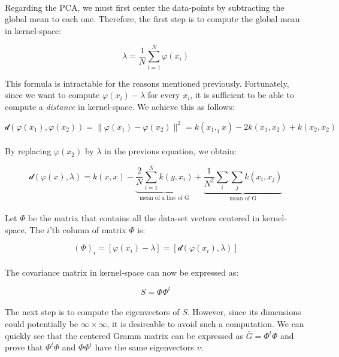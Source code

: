 \paragraph{}
Regarding the PCA, we must first center the data-points by subtracting the global mean to each one.
Therefore, the first step is to compute the global mean in kernel-space:

$$\lambda = \frac{1}{N}\sum_{i = 1}^{N} \varphi(x_i)$$

This formula is intractable for the reasons mentioned previously. Fortunately, since we want to
compute $\varphi(x_i) - \lambda$ for every $x_i$, it is sufficient to be able to compute a
\emph{distance} in kernel-space. We achieve this as follows:

$$\mathcal{d}(\varphi(x_1), \varphi(x_2)) = \|\varphi(x_1) - \varphi(x_2)\|^2 = k(x_1, _1x) - 2k(x_1, x_2) +
k(x_2, x_2)$$

\paragraph{} By replacing $\varphi(x_2)$ by $\lambda$ in the previous equation, we obtain:

$$\mathcal{d}(\varphi(x), \lambda) = k(x, x) - \underbrace{\frac{2}{N}\sum_{i = 1}^N k(y,
x_i)}_{\text{mean of a line of G}} + \underbrace{\frac{1}{N^2}\sum_i\sum_j k(x_i, x_j)}_{\text{mean
of G}}$$

\paragraph{} Let $\Phi$ be the matrix that contains all the data-set vectors centered in
kernel-space. The $i$'th column of matrix $\Phi$ is:

$$(\Phi)_i = [\varphi(x_i) - \lambda] = [\mathcal{d}(\varphi(x_i), \lambda)]$$

\paragraph{} The covariance matrix in kernel-space can now be expressed as:

$$S = \Phi\Phi^t$$

\paragraph{} The next step is to compute the eigenvectors of $S$. However, since its dimensions could
potentially be
$\infty \times \infty$, it is desireable to avoid such a computation. We can quickly see that the centered Gramm
matrix can be expressed as $\bar{G} = \Phi^t\Phi$ and prove that $\Phi^t\Phi$ and $\Phi\Phi^t$ have the same
eigenvectors $v$:

